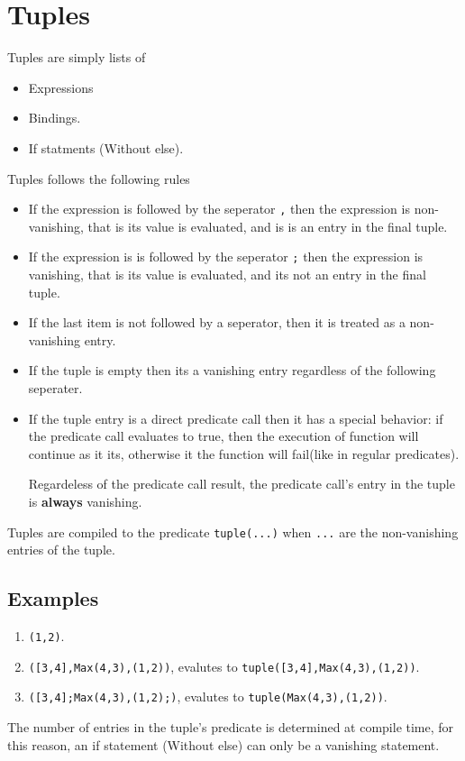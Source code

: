 \section{Tuples}

Tuples are simply lists of
\begin{itemize}
	\item Expressions
	\item Bindings.
	\item If statments (Without else).
\end{itemize}

\noindent Tuples follows the following rules
\begin{itemize}
	\item If the expression is followed by the seperator \texttt{,} then the
	      expression is non-vanishing, that is its value is evaluated, and is
	      is an entry in the final tuple.

    \item If the expression is is followed by the seperator \texttt{;} then
        the expression is vanishing, that is its value is evaluated, and its
        not an entry in the final tuple.

    \item If the last item is not followed by a seperator, then it is treated
        as a non-vanishing entry.

    \item If the tuple is empty then its a vanishing entry regardless of the
        following seperater.

        \item If the tuple entry is a direct predicate call then it has
            a special behavior: if the predicate call evaluates to
            true, then the execution of function will continue as it its,
            otherwise it the function will fail(like in regular predicates).

            Regardeless of the predicate call result, the predicate call's 
            entry in the tuple is \textbf{always} vanishing.
\end{itemize}

Tuples are compiled to the predicate \texttt{tuple(...)} when
\texttt{...} are the non-vanishing entries of the tuple.

\subsection{Examples}
\begin{enumerate}
	\item \texttt{(1,2)}.
	\item \texttt{([3,4],Max(4,3),(1,2))}, evalutes to \texttt{tuple([3,4],Max(4,3),(1,2))}.
	\item \texttt{([3,4];Max(4,3),(1,2);)}, evalutes to \texttt{tuple(Max(4,3),(1,2))}.
\end{enumerate}

\begin{note}
	The number of entries in the tuple's predicate is determined at compile time, for this reason,
	an if statement (Without else) can only be a vanishing statement.
\end{note}

